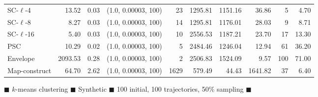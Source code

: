 \documentclass[11pt]{article}
\begin{document}
\begin{figure}
\begin{center}
\begin{minipage}{\textwidth}
{\begin{tabular}{@{}lrrrrrrrrr@{}}
SC-$\ell$-4 & 13.52 & 0.03 & (1.0, 0.00003, 100) & 23 & 1295.81 & 1151.16 & 36.86 & 5 & 4.70\\
SC-$\ell$-8 & 8.27 & 0.03 & (1.0, 0.00003, 100) & 14 & 1295.81 & 1176.01 & 28.03 & 9 & 8.71\\
SC-$\ell$-16 & 5.40 & 0.03 & (1.0, 0.00003, 100) & 10 & 2556.53 & 1187.21 & 23.70 & 17 & 13.30\\
PSC & 10.29 & 0.02 & (1.0, 0.00003, 100) & 5 & 2484.46 & 1246.04 & 12.94 & 61 & 36.20\\
Envelope & 2093.53 & 0.28 & (1.0, 0.00003, 100) & 2 & 2506.83 & 1524.09 & 9.57 & 100 & 71.00\\
Map-construct & 64.70 & 2.62 & (1.0, 0.00003, 100) & 1629 & 579.49 & 44.43 & 1641.82 & 37 & 6.40\\
        \bottomrule
    \end{tabular}
    }
  \end{minipage}
  \end{center}
        \caption{
        $\blacksquare$ $k$-means clustering $\blacksquare$ Synthetic $\blacksquare$ 100 initial, 100 trajectories, 50\% sampling $\blacksquare$}
%
    \end{figure}
\clearpage
\newpage 
%
\clearpage
%
\end{document}
